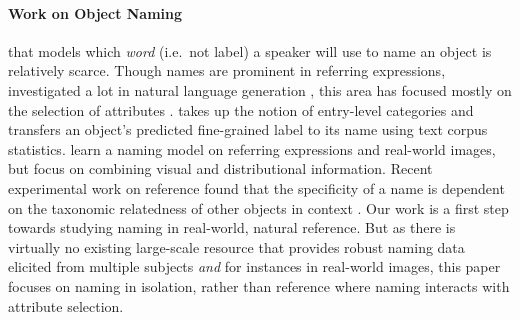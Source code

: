 \paragraph{Work on Object Naming} that models which \textit{word} (i.e.\ not label) a speaker will use to name an object is relatively scarce.
Though names are prominent in referring expressions, investigated a lot in natural language generation \cite{dale:1995}, this area has focused mostly on the selection of attributes %
\cite{krahmer:2012}. 
 takes up the notion of entry-level categories \cite{rosch1976basic} and transfers an object's predicted fine-grained label to its name using text corpus statistics.
  learn a naming model on referring expressions and real-world images, but focus on combining visual and distributional information. 
 Recent experimental work on reference found that the specificity of a name is dependent on the taxonomic relatedness of other objects in context
\cite{rohde2012communicating,graf2016animal}. Our work is a first step towards studying naming in real-world, natural reference.
But as there is virtually no existing large-scale resource that provides robust naming data elicited from multiple subjects \textit{and} for instances in real-world images, this paper focuses on naming in isolation, rather than reference where naming interacts with attribute selection.





